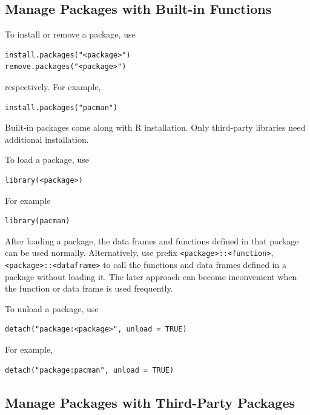 \subsection{Manage Packages with Built-in Functions}

To install or remove a package, use
\begin{lstlisting}
install.packages("<package>")
remove.packages("<package>")
\end{lstlisting}
respectively. For example,
\begin{lstlisting}
install.packages("pacman")
\end{lstlisting}
Built-in packages come along with R installation. Only third-party libraries need additional installation.

To load a package, use
\begin{lstlisting}
library(<package>)
\end{lstlisting}
For example
\begin{lstlisting}
library(pacman)
\end{lstlisting}
After loading a package, the data frames and functions defined in that package can be used normally. Alternatively, use prefix \verb|<package>::<function>|, \verb|<package>::<dataframe>| to call the functions and data frames defined in a package without loading it. The later approach can become inconvenient when the function or data frame is used frequently. 

To unload a package, use
\begin{lstlisting}
detach("package:<package>", unload = TRUE)
\end{lstlisting}
For example,
\begin{lstlisting}
detach("package:pacman", unload = TRUE)
\end{lstlisting}

\subsection{Manage Packages with Third-Party Packages}

